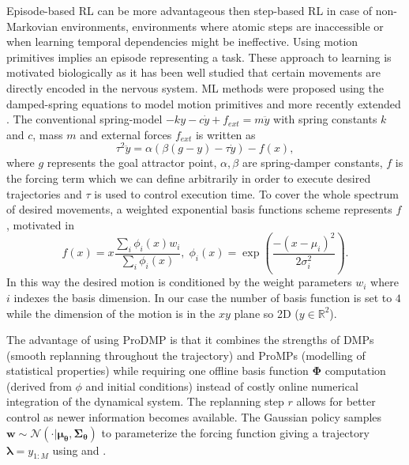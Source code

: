 \documentclass[letterpaper,conference,10pt]{IEEEconf}
\begin{document}
Episode-based RL can be more advantageous then step-based RL in case of non-Markovian environments, environments where atomic steps are inaccessible or when learning temporal dependencies might be ineffective. Using motion primitives implies an episode representing a task. These approach to learning is motivated biologically as it has been well studied that certain movements are directly encoded in the nervous system. ML methods were proposed using the damped-spring equations to model motion primitives \cite{Schaal2006} and more recently extended \cite{li_prodmps_2022}. The conventional spring-model $-ky-c\dot{y}+f_{ext}=m\ddot{y}$ with spring constants $k$ and $c$, mass $m$ and external forces $f_{ext}$ is written as
\begin{equation}
    \label{eq:spring_model}
    \tau^2\ddot{y}=\alpha(\beta(g-y)-\tau\dot{y})-f(x),
\end{equation}
where $g$ represents the goal attractor point, $\alpha,\beta$ are spring-damper constants, $f$ is the forcing term which we can define arbitrarily in order to execute desired trajectories and $\tau$ is used to control execution time. To cover the whole spectrum of desired movements, a weighted exponential basis functions scheme represents $f$, motivated in \cite[Section 2.1]{Schaal2006}
\begin{equation}
    \label{eq:forcing_term}
    f(x)=x\dfrac{\sum_i\phi_i(x)w_i}{\sum_i\phi_i(x)}, \; \phi_i(x)=\exp{\left(\dfrac{-(x-\mu_i)^2}{2\sigma_i^2}\right)}.
\end{equation}
In this way the desired motion is conditioned by the weight parameters $w_i$ where $i$ indexes the basis dimension. In our case the number of basis function is set to $4$ while the dimension of the motion is in the $xy$ plane so 2D ($y\in\mathbb{R}^2$).

The advantage of using ProDMP \cite{li_prodmps_2022} is that it combines the strengths of DMPs (smooth replanning throughout the trajectory) and ProMPs (modelling of statistical properties) while requiring one offline basis function $\boldsymbol{\Phi}$ computation (derived from $\phi$ and initial conditions) instead of costly online numerical integration of the dynamical system. The replanning step $r$ allows for better control as newer information becomes available. The Gaussian policy samples $\boldsymbol{w}\sim\mathcal{N}(\cdot\vert\boldsymbol{\mu}_{\boldsymbol{\theta}},\boldsymbol{\Sigma}_{\boldsymbol{\theta}})$ to parameterize the forcing function giving a trajectory $\boldsymbol{\lambda}=y_{1:M}$ using  and .
\end{document}
